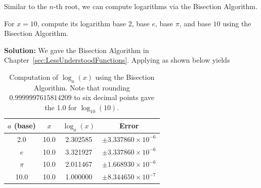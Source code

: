 Similar to the $n$-th root, we can compute logarithms via the Bisection Algorithm.

\begin{example} 
For $x=10$, compute its logarithm base $2$, base $e$, base $\pi$, and base $10$ using the Bisection Algorithm.    
\end{example}

\textbf{Solution:}  We gave the Bisection Algorithm in Chapter~\ref{sec:LessUnderstoodFunctions}.  Applying as shown below yields


\begin{table}[ht]
\centering
\begin{tabular}{|c|c|c|c|}
\hline
$a$ (base) & $x$ & $\log_a(x)$ & Error \\
\hline
\hline
2.0 & 10.0 & 2.302585 & $\pm 3.337860 \times 10^{-6}$  \\ \hline
$e$ & 10.0 & 3.321927 & $\pm 3.337860 \times 10^{-6}$ \\ \hline
$\pi$ & 10.0 & 2.011467 & $\pm 1.668930 \times 10^{-6}$ \\ \hline
10.0 & 10.0 & 1.000000 & $\pm 8.344650 \times 10^{-7}$ \\
\hline
\end{tabular}
\caption{Computation of $\log_a(x)$ using the Bisection Algorithm. Note that rounding $0.9999997615814209$ to six decimal points gave the 1.0 for $\log_{10}(10)$.}
\label{table:logBaseA}
\end{table}


